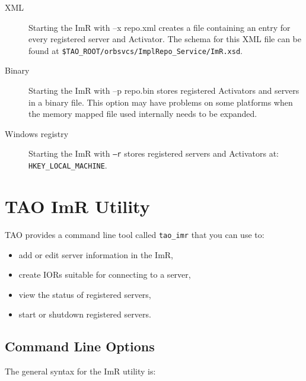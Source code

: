 \begin{itemize}
{\begin{itemize}
{\begin{description}
    \item [XML] Starting the ImR with –x repo.xml creates a file containing 
              an entry for every registered server and Activator. The schema for 
              this XML file can be found at 
              {\tt \$TAO\_ROOT/orbsvcs/ImplRepo\_Service/ImR.xsd}.

    \item [Binary] Starting the ImR with –p repo.bin stores registered 
              Activators  and servers in a binary file.   This option may have 
              problems on some platforms when the memory mapped file 
              used internally needs to be expanded.

    \item [Windows registry] Starting the ImR with {\tt –r} stores registered servers
               and Activators at:
               {\tt HKEY_LOCAL_MACHINE\SOFTWARE\TAO\ImplementationRepository}.
 \end{description}

\section{TAO ImR Utility}
\label{taoimrutil}

TAO provides a command line tool called {\tt tao_imr} that you can use to:

\begin{itemize}
    \item add or edit server information in the ImR,
    \item create IORs suitable for connecting to a server,
    \item view the status of registered servers,
    \item start or shutdown registered servers.
\end{itemize}

\subsection{Command Line Options}

The general syntax for the ImR utility is:

}
\end{itemize}}
\end{itemize}
